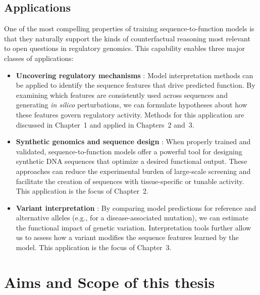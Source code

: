 \begin{dissertationintroduction}
\subsection{Applications}

One of the most compelling properties of training sequence-to-function models is that they naturally support the kinds of counterfactual reasoning most relevant to open questions in regulatory genomics. This capability enables three major classes of applications:

\begin{itemize}
  \item \textbf{Uncovering regulatory mechanisms} \cite{Toneyan2024-nt}: Model interpretation methods can be applied to identify the sequence features that drive predicted function. By examining which features are consistently used across sequences and generating \textit{in silico} perturbations, we can formulate hypotheses about how these features govern regulatory activity. Methods for this application are discussed in Chapter~1 and applied in Chapters~2 and~3.

  \item \textbf{Synthetic genomics and sequence design} \cite{De-Winter2025-nz}: When properly trained and validated, sequence-to-function models offer a powerful tool for designing synthetic DNA sequences that optimize a desired functional output. These approaches can reduce the experimental burden of large-scale screening and facilitate the creation of sequences with tissue-specific or tunable activity. This application is the focus of Chapter~2.

  \item \textbf{Variant interpretation} \cite{Dey2020-lf}: By comparing model predictions for reference and alternative alleles (e.g., for a disease-associated mutation), we can estimate the functional impact of genetic variation. Interpretation tools \cite{Shrikumar2017-og} further allow us to assess how a variant modifies the sequence features learned by the model. This application is the focus of Chapter~3.
\end{itemize}


\section{Aims and Scope of this thesis}


\end{dissertationintroduction}
